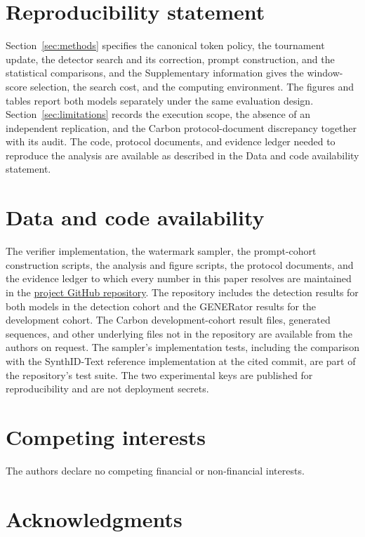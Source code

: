 \documentclass[10pt,twocolumn]{article}
\begin{document}
\section*{Reproducibility statement}

Section~\ref{sec:methods} specifies the canonical token policy, the tournament update, the
detector search and its correction, prompt construction, and the statistical comparisons, and the
Supplementary information gives the window-score selection, the search cost, and the computing
environment. The figures and tables report both models separately under the same evaluation
design. Section~\ref{sec:limitations} records the execution scope, the absence of an independent
replication, and the Carbon protocol-document discrepancy together with its audit. The code,
protocol documents, and evidence ledger needed to reproduce the analysis are available as
described in the Data and code availability statement.

\section*{Data and code availability}

The verifier implementation, the watermark sampler, the prompt-cohort construction scripts, the
analysis and figure scripts, the protocol documents, and the evidence ledger to which every number
in this paper resolves are maintained in the
\href{https://github.com/Georgakopoulos-Soares-lab/genomic-sampling-watermarks}{project GitHub
repository}. The repository includes the detection results for both models in the detection
cohort and the GENERator results for the development cohort. The Carbon development-cohort result
files, generated sequences, and other underlying files not in the repository are available from
the authors on request. The sampler's implementation tests, including the comparison with the
SynthID-Text reference implementation at the cited commit, are part of the repository's test
suite. The two experimental keys are published for reproducibility and are not deployment secrets.

\section*{Competing interests}

The authors declare no competing financial or non-financial interests.

\section*{Acknowledgments}
\end{document}
